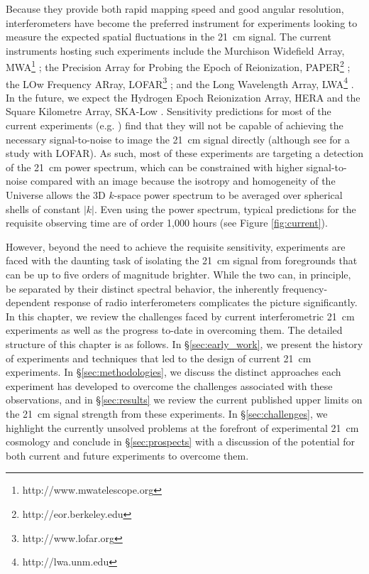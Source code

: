 Because they provide both rapid mapping speed and good angular resolution, interferometers have become the preferred instrument for experiments looking to measure the expected spatial fluctuations in the 21~cm signal. 
The current instruments hosting such experiments include the Murchison Widefield Array, MWA{\footnote[1]{http://www.mwatelescope.org}} \cite{bowman13_mwascience,tingay13_mwasystem,jacobs16}; the Precision Array for Probing the Epoch of Reionization, PAPER{\footnote[2]{http://eor.berkeley.edu}} \cite{parsons10}; the LOw Frequency ARray, LOFAR{\footnote[3]{http://www.lofar.org}} \cite{vanhaarlem13,patil16}; and the Long Wavelength Array, LWA{\footnote[4]{http://lwa.unm.edu}} \cite{ellingson09}. In the future, we expect the Hydrogen Epoch Reionization Array, HERA \cite{deboer16} and the Square Kilometre Array, SKA-Low \cite{koopmans15}.
Sensitivity predictions for most of the current experiments (e.g. \cite{beardsley13,pober14}) find that they will not be capable of achieving the necessary signal-to-noise to image the 21~cm signal directly (although see \cite{2012MNRAS.425.2964Z} for a study with LOFAR).  As such, most of these experiments are targeting a detection of the 21~cm power spectrum, which can be constrained with higher signal-to-noise compared with an image because the isotropy and homogeneity of the Universe allows the 3D $k$-space power spectrum to be averaged over spherical shells of constant $|k|$.  
Even using the power spectrum, typical predictions for the requisite observing time are of order 1,000 hours (see Figure \ref{fig:current}).  

However, beyond the need to achieve the requisite sensitivity, experiments are faced with the daunting task of isolating the 21~cm signal from foregrounds that can be up to five orders of magnitude brighter.  While the two can, in principle, be separated by their distinct spectral behavior, the inherently frequency-dependent response of radio interferometers complicates the picture significantly.  In this chapter, we review the challenges faced by current interferometric 21~cm experiments as well as the progress to-date in overcoming them.  The detailed structure of this chapter is as follows.  In \S\ref{sec:early_work}, we present the history of experiments and techniques that led to the design of current 21~cm experiments.  In \S\ref{sec:methodologies}, we discuss the distinct approaches each experiment has developed to overcome the challenges associated with these observations, and in \S\ref{sec:results} we review the current published upper limits on the 21~cm signal strength from these experiments.  In \S\ref{sec:challenges}, we highlight the currently unsolved problems at the forefront of experimental 21~cm cosmology and conclude in \S\ref{sec:prospects} with a discussion of the potential for both current and future experiments to overcome them.

